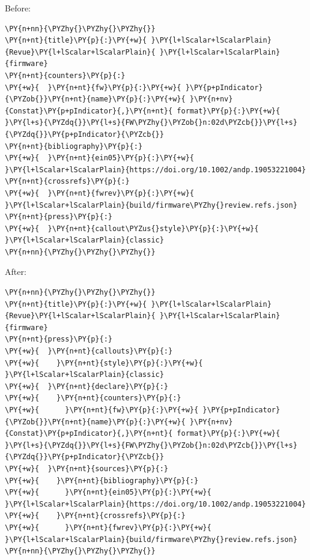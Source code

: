 \documentclass[a4paper,twoside]{article}
\begin{document}
Before:
\begin{tscode}[lang=yaml, engine=pygments]
\begin{Verbatim}[commandchars=\\\{\},breaklines, breakanywhere, commandchars=\\\{\}]
\PY{n+nn}{\PYZhy{}\PYZhy{}\PYZhy{}}
\PY{n+nt}{title}\PY{p}{:}\PY{+w}{ }\PY{l+lScalar+lScalarPlain}{Revue}\PY{l+lScalar+lScalarPlain}{ }\PY{l+lScalar+lScalarPlain}{firmware}
\PY{n+nt}{counters}\PY{p}{:}
\PY{+w}{  }\PY{n+nt}{fw}\PY{p}{:}\PY{+w}{ }\PY{p+pIndicator}{\PYZob{}}\PY{n+nt}{name}\PY{p}{:}\PY{+w}{ }\PY{n+nv}{Constat}\PY{p+pIndicator}{,}\PY{n+nt}{ format}\PY{p}{:}\PY{+w}{ }\PY{l+s}{\PYZdq{}}\PY{l+s}{FW\PYZhy{}\PYZob{}n:02d\PYZcb{}}\PY{l+s}{\PYZdq{}}\PY{p+pIndicator}{\PYZcb{}}
\PY{n+nt}{bibliography}\PY{p}{:}
\PY{+w}{  }\PY{n+nt}{ein05}\PY{p}{:}\PY{+w}{ }\PY{l+lScalar+lScalarPlain}{https://doi.org/10.1002/andp.19053221004}
\PY{n+nt}{crossrefs}\PY{p}{:}
\PY{+w}{  }\PY{n+nt}{fwrev}\PY{p}{:}\PY{+w}{ }\PY{l+lScalar+lScalarPlain}{build/firmware\PYZhy{}review.refs.json}
\PY{n+nt}{press}\PY{p}{:}
\PY{+w}{  }\PY{n+nt}{callout\PYZus{}style}\PY{p}{:}\PY{+w}{ }\PY{l+lScalar+lScalarPlain}{classic}
\PY{n+nn}{\PYZhy{}\PYZhy{}\PYZhy{}}
\end{Verbatim}
\end{tscode}
After:
\begin{tscode}[lang=yaml, engine=pygments]
\begin{Verbatim}[commandchars=\\\{\},breaklines, breakanywhere, commandchars=\\\{\}]
\PY{n+nn}{\PYZhy{}\PYZhy{}\PYZhy{}}
\PY{n+nt}{title}\PY{p}{:}\PY{+w}{ }\PY{l+lScalar+lScalarPlain}{Revue}\PY{l+lScalar+lScalarPlain}{ }\PY{l+lScalar+lScalarPlain}{firmware}
\PY{n+nt}{press}\PY{p}{:}
\PY{+w}{  }\PY{n+nt}{callouts}\PY{p}{:}
\PY{+w}{    }\PY{n+nt}{style}\PY{p}{:}\PY{+w}{ }\PY{l+lScalar+lScalarPlain}{classic}
\PY{+w}{  }\PY{n+nt}{declare}\PY{p}{:}
\PY{+w}{    }\PY{n+nt}{counters}\PY{p}{:}
\PY{+w}{      }\PY{n+nt}{fw}\PY{p}{:}\PY{+w}{ }\PY{p+pIndicator}{\PYZob{}}\PY{n+nt}{name}\PY{p}{:}\PY{+w}{ }\PY{n+nv}{Constat}\PY{p+pIndicator}{,}\PY{n+nt}{ format}\PY{p}{:}\PY{+w}{ }\PY{l+s}{\PYZdq{}}\PY{l+s}{FW\PYZhy{}\PYZob{}n:02d\PYZcb{}}\PY{l+s}{\PYZdq{}}\PY{p+pIndicator}{\PYZcb{}}
\PY{+w}{  }\PY{n+nt}{sources}\PY{p}{:}
\PY{+w}{    }\PY{n+nt}{bibliography}\PY{p}{:}
\PY{+w}{      }\PY{n+nt}{ein05}\PY{p}{:}\PY{+w}{ }\PY{l+lScalar+lScalarPlain}{https://doi.org/10.1002/andp.19053221004}
\PY{+w}{    }\PY{n+nt}{crossrefs}\PY{p}{:}
\PY{+w}{      }\PY{n+nt}{fwrev}\PY{p}{:}\PY{+w}{ }\PY{l+lScalar+lScalarPlain}{build/firmware\PYZhy{}review.refs.json}
\PY{n+nn}{\PYZhy{}\PYZhy{}\PYZhy{}}
\end{Verbatim}
\end{tscode}
\end{document}
